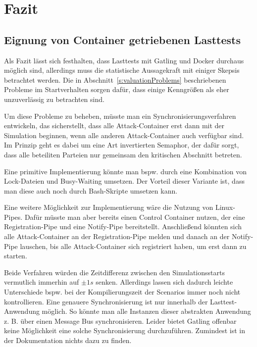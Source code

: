 \chapter{Fazit}

\section{Eignung von Container getriebenen Lasttests}
\label{s:conclusionContainerDrivenStressTests}

Als Fazit l\"asst sich festhalten, dass Lasttests mit Gatling und Docker durchaus m\"oglich sind, allerdings muss die statistische Aussagekraft mit einiger Skepsis betrachtet werden.
Die in Abschnitt~\ref{s:valuationProblems} beschriebenen Probleme im Startverhalten sorgen daf\"ur, dass einige Kenngr\"o\ss{}en als eher unzuverl\"assig zu betrachten sind.

Um diese Probleme zu beheben, m\"usste man ein Synchronisierungsverfahren entwickeln, das sicherstellt, dass alle Attack-Container erst dann mit der Simulation beginnen, wenn alle anderen Attack-Container auch verf\"ugbar sind.
Im Prinzip geht es dabei um eine Art invertierten Semaphor, der daf\"ur sorgt, dass alle beteiliten Parteien nur gemeinsam den kritischen Abschnitt betreten.

Eine primitive Implementierung k\"onnte man bspw. durch eine Kombination von Lock-Dateien und Busy-Waiting umsetzen.
Der Vorteil dieser Variante ist, dass man diese auch noch durch Bash-Skripte umsetzen kann.

Eine weitere M\"oglichkeit zur Implementierung w\"are die Nutzung von Linux-Pipes.
Daf\"ur m\"usste man aber bereits einen Control Container nutzen, der eine \glqq{}Registration-Pipe\grqq{} und eine \glqq{}Notify-Pipe\grqq{} bereitstellt.
Anschlie\ss{}end k\"onnten sich alle Attack-Container an der \glqq{}Registration-Pipe\grqq{} melden und danach an der \glqq{}Notify-Pipe\grqq{} lauschen, bis alle Attack-Container sich registriert haben, um erst dann zu starten.

Beide Verfahren w\"urden die Zeitdifferenz zwischen den Simulationsstarts vermutlich immerhin auf $\pm 1s$ senken.
Allerdings lassen sich dadurch leichte Unterschiede bspw. bei der Kompilierungszeit der Scenarios immer noch nicht kontrollieren.
Eine genauere Synchronisierung ist nur innerhalb der Lasttest-Anwendung m\"oglich.
So k\"onnte man alle Instanzen dieser abstrakten Anwendung z. B. \"uber einen Message Bus synchronisieren.
Leider bietet Gatling offenbar keine M\"oglichkeit eine solche Synchronisierung durchzuf\"uhren.
Zumindest ist in der Dokumentation nichts dazu zu finden.

